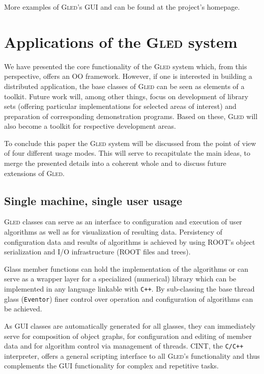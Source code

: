 \documentclass[a4paper,11pt]{article}
\def\gled{\textsc{Gled}\xspace}
\def\smalltt#1{{\small\texttt{#1}}}
\begin{document}
More examples of \gled's GUI and can be found at the
project's homepage\cite{gled.org}.

\section{Applications of the \gled system}

We have presented the core functionality of the \gled system which,
from this perspective, offers an OO framework. However, if one is
interested in building a distributed application, the base classes of
\gled can be seen as elements of a toolkit. Future work will, among
other things, focus on development of library sets (offering
particular implementations for selected areas of interest) and
preparation of corresponding demonstration programs. Based on these,
\gled will also become a toolkit for respective development areas.

To conclude this paper the \gled system will be discussed from the point
of view of four different usage modes. This will serve to recapitulate
the main ideas, to merge the presented details into a coherent whole
and to discuss future extensions of \gled.

\subsection{Single machine, single user usage}

\gled classes can serve as an interface to configuration and execution
of user algorithms as well as for visualization of resulting data.
Persistency of configuration data and results of algorithms is
achieved by using ROOT's object serialization and I/O infrastructure
(ROOT files and trees).

Glass member functions can hold the implementation of the algorithms or
can serve as a wrapper layer for a specialized (numerical) library
which can be implemented in any language linkable with \smalltt{C++}.
By sub-classing the base thread glass (\smalltt{Eventor}) finer
control over operation and configuration of algorithms can be
achieved.

As GUI classes are automatically generated for all glasses, they can
immediately serve for composition of object graphs, for configuration
and editing of member data and for algorithm control via management of
threads. CINT, the \smalltt{C/C++} interpreter, offers a general
scripting interface to all \gled's functionality and thus
complements the GUI functionality for complex and repetitive tasks.
\end{document}
